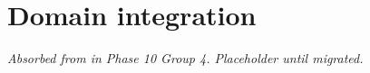 \chapter{Domain integration}
\label{chap:dev-domain-integration}

\textit{Absorbed from
 in Phase
10 Group 4. Placeholder until migrated.}
